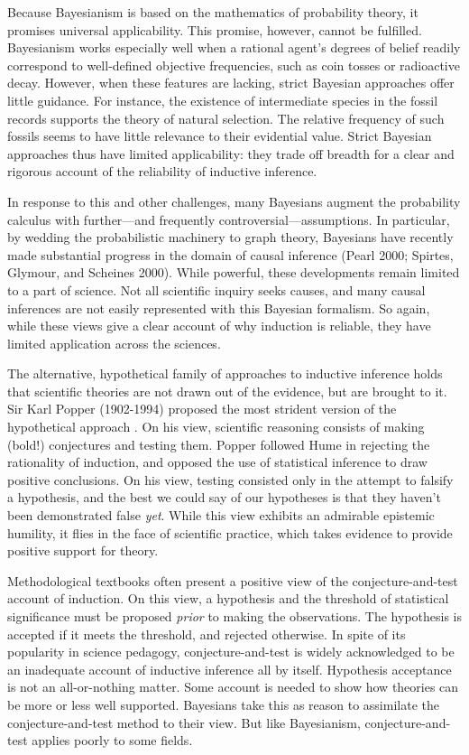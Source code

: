 \documentclass{article}[11pt]
\begin{document}
Because Bayesianism is based on the mathematics of probability theory, it promises universal applicability.  This promise, however, cannot be fulfilled.  Bayesianism works especially well when a rational agent's degrees of belief readily correspond to well-defined objective frequencies, such as coin tosses or radioactive decay. However, when these features are lacking, strict Bayesian approaches offer little guidance. For instance, the existence of intermediate species in the fossil records supports the theory of natural selection.  The relative frequency of such fossils seems to have little relevance to their evidential value.  Strict Bayesian approaches thus have limited applicability: they trade off breadth for a clear and rigorous account of the reliability of inductive inference.


In response to this and other challenges, many Bayesians augment the probability calculus with further---and frequently controversial---assumptions.  In particular, by wedding the probabilistic machinery to graph theory, Bayesians have recently made substantial progress in the domain of causal inference (Pearl 2000; Spirtes, Glymour, and Scheines 2000). While powerful, these developments remain limited to a part of science. Not all scientific inquiry seeks causes, and many causal inferences are not easily represented with this Bayesian formalism.  So again, while these views give a clear account of why induction is reliable, they have limited application across the sciences.

The alternative, hypothetical family of approaches to inductive inference holds that scientific theories are not drawn out of the evidence, but are brought to it. Sir Karl Popper (1902-1994) proposed the most strident version of the hypothetical approach \citep{Popper1963}.  On his view, scientific reasoning consists of making (bold!) conjectures and testing them.  Popper followed Hume in rejecting the rationality of induction, and opposed the use of statistical inference to draw positive conclusions.  On his view, testing consisted only in the attempt to falsify a hypothesis, and the best we could say of our hypotheses is that they haven't been demonstrated false \textit{yet}.  While this view exhibits an admirable epistemic humility, it flies in the face of scientific practice, which takes evidence to provide positive support for theory.

Methodological textbooks often present a positive view of the conjecture-and-test account of induction.  On this view, a hypothesis and the threshold of statistical significance must be proposed \textit{prior} to making the observations. The hypothesis is accepted if it meets the threshold, and rejected otherwise.  In spite of its popularity in science pedagogy, conjecture-and-test is widely acknowledged to be an inadequate account of inductive inference all by itself.  Hypothesis acceptance is not an all-or-nothing matter.  Some account is needed to show how theories can be more or less well supported. Bayesians take this as reason to assimilate the conjecture-and-test method to their view. But like Bayesianism, conjecture-and-test applies poorly to some fields.  
\end{document}
